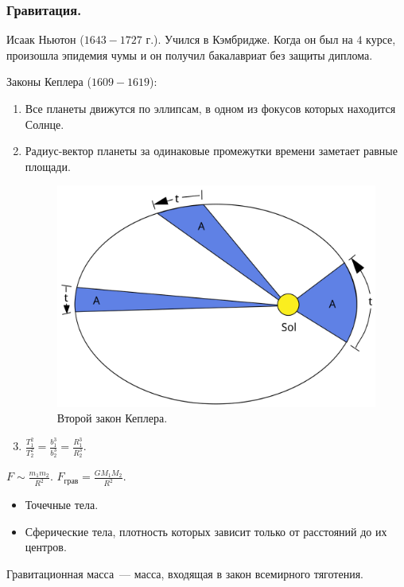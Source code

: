 \documentclass{article}
\begin{document}
	\subsubsection{Гравитация.}
	\begin{definition}
		Исаак Ньютон ($1643 - 1727$ г.). Учился в Кэмбридже. Когда он был на $4$ курсе, произошла эпидемия чумы и он получил бакалавриат без защиты диплома.
	\end{definition}
	\begin{definition}
		Законы Кеплера ($1609 - 1619$):
		\begin{enumerate}
		\item Все планеты движутся по эллипсам, в одном из фокусов которых находится Солнце.
		\item Радиус-вектор планеты за одинаковые промежутки времени заметает равные площади. \\
		\begin{figure}[H]
			\includegraphics[height=0.25\textwidth]{extra-materials/Второй-закон-Кеплера}
			\caption{Второй закон Кеплера.}
		\end{figure}
		\item $\frac{T_1^2}{T_2^2} = \frac{b_1^3}{b_2^3} = \frac{R_1^3}{R_2^3}$.
		\end{enumerate}
	\end{definition}
	\begin{definition}
		$F \sim \frac{m_1m_2}{R^2}$. $F_{\text{грав}} = \frac{GM_1M_2}{R^2}$.
	\end{definition}
	\begin{statement}
		\begin{itemize}
			\item Точечные тела.
			\item Сферические тела, плотность которых зависит только от расстояний до их центров.
		\end{itemize}
	\end{statement}
	\begin{definition}
		Гравитационная масса~--- масса, входящая в закон всемирного тяготения.
	\end{definition}
\end{document}
